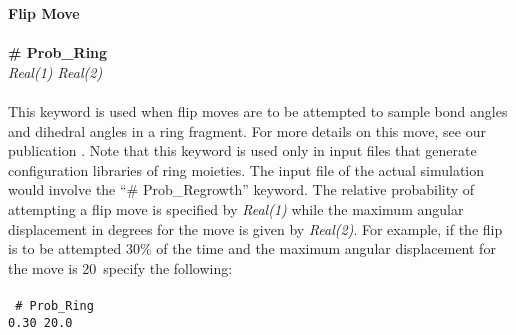 %
{\bf Flip Move}\\ \\
{\bf \# Prob\_Ring} \\
{\it Real(1) Real(2)} \\ \\
%
This keyword is used when flip moves are to be attempted to sample bond angles and 
dihedral angles in a ring fragment. 
For more details on this move, see our publication \cite{Shah:2011}. 
Note that this keyword is used only in input files
that generate configuration libraries of ring moieties. The input file of the 
actual simulation would involve the ``\# Prob\_Regrowth'' keyword.
The relative probability of attempting a flip move is 
specified by {\it Real(1)} while the maximum angular displacement 
in degrees for the move is given by {\it Real(2)}. 
For example, if the flip is to be attempted 30\% of the 
time and the maximum angular displacement for the 
move is 20\degree~specify the following: \\ \\
%
\texttt{
\# Prob\_Ring \\
0.30 20.0 \\ \\}
%
%
